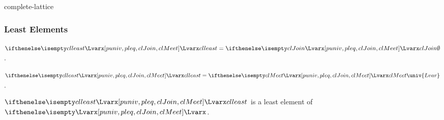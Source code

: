 \documentclass{stex}
\begin{document}
\begin{smodule}{complete-lattice}
  \subsubsection{Least Elements}

  \begin{forthel}
    \begin{definition}
      $\least{Lvar} = \Join{Lvar} \emptyset$.
    \end{definition}

    \begin{proposition}
      $\least{Lvar} = \Meet{Lvar} \univ{Lvar}$.
    \end{proposition}

    \begin{proposition}
      $\least{Lvar}$ is a least element of $\Lvar{}$.
    \end{proposition}
  \end{forthel}
\end{smodule}
\end{document}
